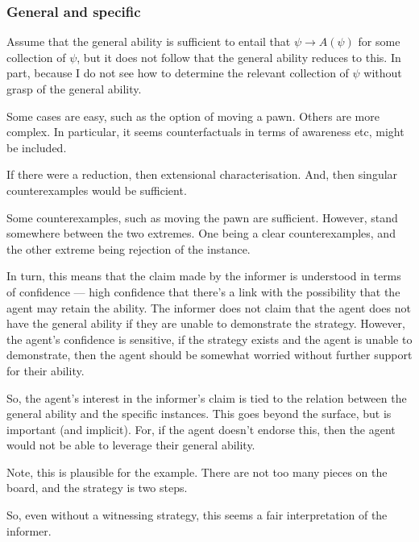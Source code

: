 \documentclass[10pt]{article}
\begin{document}
\subsubsection{General and specific}
\label{sec:general-specific}

\begin{note}[GandS]
Assume that the general ability is sufficient to entail that \(\psi \rightarrow A(\psi)\) for some collection of \(\psi\), but it does not follow that the general ability reduces to this.
  In part, because I do not see how to determine the relevant collection of \(\psi\) without grasp of the general ability.

  Some cases are easy, such as the option of moving a pawn.
  Others are more complex.
  In particular, it seems counterfactuals in terms of awareness etc, might be included.

  If there were a reduction, then extensional characterisation.
  And, then singular counterexamples would be sufficient.

  Some counterexamples, such as moving the pawn are sufficient.
  However, stand somewhere between the two extremes.
  One being a clear counterexamples, and the other extreme being rejection of the instance.

  In turn, this means that the claim made by the informer is understood in terms of confidence --- high confidence that there's a link with the possibility that the agent may retain the ability.
  The informer does not claim that the agent does not have the general ability if they are unable to demonstrate the strategy.
  However, the agent's confidence is sensitive, if the strategy exists and the agent is unable to demonstrate, then the agent should be somewhat worried without further support for their ability.

  So, the agent's interest in the informer's claim is tied to the relation between the general ability and the specific instances.
  This goes beyond the surface, but is important (and implicit).
  For, if the agent doesn't endorse this, then the agent would not be able to leverage their general ability.

  Note, this is plausible for the example.
  There are not too many pieces on the board, and the strategy is two steps.

  So, even without a witnessing strategy, this seems a fair interpretation of the informer.
\end{note}
\end{document}
